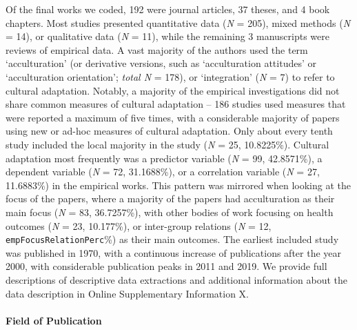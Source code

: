 

Of the final works we coded, 192 were journal articles, 37 theses, and 4
book chapters. Most studies presented quantitative data (\textit{N} =
205), mixed methods (\textit{N} = 14), or qualitative data (\textit{N} =
11), while the remaining 3 manuscripts were reviews of empirical data. A
vast majority of the authors used the term `acculturation' (or
derivative versions, such as `acculturation attitudes' or `acculturation
orientation'; \textit{total N} = 178), or `integration' (\textit{N} = 7)
to refer to cultural adaptation. Notably, a majority of the empirical
investigations did not share common measures of cultural adaptation --
186 studies used measures that were reported a maximum of five times,
with a considerable majority of papers using new or ad-hoc measures of
cultural adaptation. Only about every tenth study included the local
majority in the study (\textit{N} = 25, 10.8225\%). Cultural adaptation
most frequently was a predictor variable (\textit{N} = 99, 42.8571\%), a
dependent variable (\textit{N} = 72, 31.1688\%), or a correlation
variable (\textit{N} = 27, 11.6883\%) in the empirical works. This
pattern was mirrored when looking at the focus of the papers, where a
majority of the papers had acculturation as their main focus (\textit{N}
= 83, 36.7257\%), with other bodies of work focusing on health outcomes
(\textit{N} = 23, 10.177\%), or inter-group relations (\textit{N} = 12,
\texttt{empFocusRelationPerc}\%) as their main outcomes. The earliest
included study was published in 1970, with a continuous increase of
publications after the year 2000, with considerable publication peaks in
2011 and 2019. We provide full descriptions of descriptive data
extractions and additional information about the data description in
Online Supplementary Information X.

\paragraph{Field of Publication}

